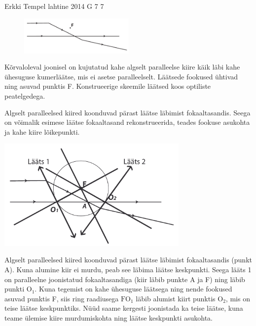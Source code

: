 {Erkki Tempel} %
{lahtine} %
{2014} %
{G 7} %
{7} %
{
\ifStatement
\begin{figure}
 \includegraphics[width=0.5\textwidth]{2014-lahg-07-optilineskeemjoonis}
\end{figure}
Kõrvaloleval joonisel on kujutatud kahe algselt paralleelse kiire käik läbi kahe ühesuguse kumerläätse, mis ei asetse paralleelselt. Läätsede fookused ühtivad ning asuvad punktis F. Konstrueerige skeemile läätsed koos optiliste peatelgedega.
\fi


\ifHint
Algselt paralleelsed kiired koonduvad pärast läätse läbimist fokaaltasandis. Seega on võimalik esimese läätse fokaaltasand rekonstrueerida, teades fookuse asukohta ja kahe kiire lõikepunkti.
\fi


\ifSolution
\begin{center}
\includegraphics[width=0.7\textwidth]{2014-lahg-07-optilineskeemlahendus}
\end{center}
Algselt paralleelsed kiired koonduvad pärast läätse läbimist fokaaltasandis (punkt A). Kuna alumine kiir ei murdu, peab see läbima läätse keskpunkti. Seega lääts 1 on paralleelne joonistatud fokaaltasandiga (kiir läbib punkte A ja F) ning läbib punkti $\text{O}_1$. Kuna tegemist on kahe ühesuguse läätsega ning nende fookused asuvad punktis F, siis ring raadiusega $\text{FO}_1$ läbib alumist kiirt punktis $\text{O}_2$, mis on teise läätse keskpunktiks. Nüüd saame kergesti joonistada ka teise läätse, kuna teame ülemise kiire murdumiskohta ning läätse keskpunkti asukohta.
\fi


}
